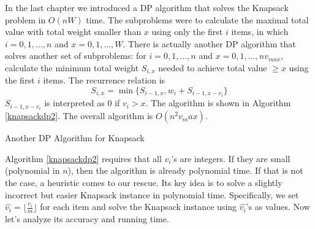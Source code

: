 In the last chapter we introduced a DP algorithm that solves the Knapsack problem in $O(nW)$ time. The subproblems were to calculate the maximal total value with total weight smaller than $x$ using only the first $i$ items, in which $i=0,1,\dots,n$ and $x=0,1,\dots,W$. There is actually another DP algorithm that solves another set of subproblems: for $i=0,1,\dots,n$ and $x=0,1,\dots,nv_{max}$, calculate the minimum total weight $S_{i,x}$ needed to achieve total value $\geq x$ using the first $i$ items. The recurrence relation is
\begin{equation*}
S_{i,x} = \min\{S_{i-1,x}, w_i+S_{i-1,x-v_i}\}
\end{equation*} 
$S_{i-1,x-v_i}$ is interpreted as 0 if $v_i>x$. The algorithm is shown in Algorithm \ref{knapsackdp2}. The overall algorithm is $O(n^2v_max)$.
\begin{algorithm}[ht]
\caption{Another DP Algorithm for Knapsack}\label{knapsackdp2}
\begin{algorithmic}[1]
\EndIf\EndFor\EndFor
{}
\end{algorithmic}
\end{algorithm}

Algorithm \ref{knapsackdp2} requires that all $v_i$'s are integers. If they are small (polynomial in $n$), then the algorithm is already polynomial time. If that is not the case, a heuristic comes to our rescue. Its key idea is to solve a slightly incorrect but easier Knapsack instance in polynomial time. Specifically, we set $\hat{v_i}=\lfloor\frac{v_i}{m}\rfloor$ for each item and solve the Knapsack instance using $\hat{v_i}$'s as values. Now let's analyze its accuracy and running time.

